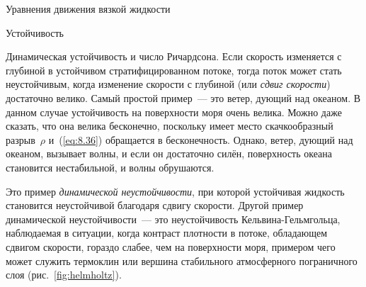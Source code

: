 \begin{chapter}{Уравнения движения вязкой жидкости}
\begin{section}{Устойчивость}
\begin{paragraph}{Динамическая устойчивость и число Ричардсона.}
Если скорость изменяется с глубиной в устойчивом стратифицированном
потоке, тогда поток может стать неустойчивым, когда изменение скорости с
глубиной (или \textit{сдвиг скорости})
достаточно велико. Самый простой пример~--- это ветер, дующий над океаном. 
В данном случае устойчивость на поверхности моря очень велика. 
Можно даже сказать, что она велика бесконечно, поскольку имеет место 
скачкообразный разрыв~$\rho$ и~(\ref{eq:8.36}) обращается в бесконечность.
Однако, ветер, дующий над океаном, вызывает волны, и если он достаточно силён,
поверхность океана становится нестабильной, и волны обрушаются.
%

Это пример 
\emph{динамической неустойчивости}, 
при которой устойчивая жидкость становится неустойчивой благодаря сдвигу 
скорости. Другой пример динамической неустойчивости~--- это неустойчивость
Кельвина-Гельм\-гольца, наблюдаемая в ситуации, когда контраст плотности
в потоке, обладающем сдвигом скорости, 
гораздо слабее, чем на поверхности моря, примером чего может
служить термоклин или вершина стабильного атмосферного 
пограничного слоя (рис.~\ref{fig:helmholtz}).
%


\end{paragraph}
\end{section}
\end{chapter}
